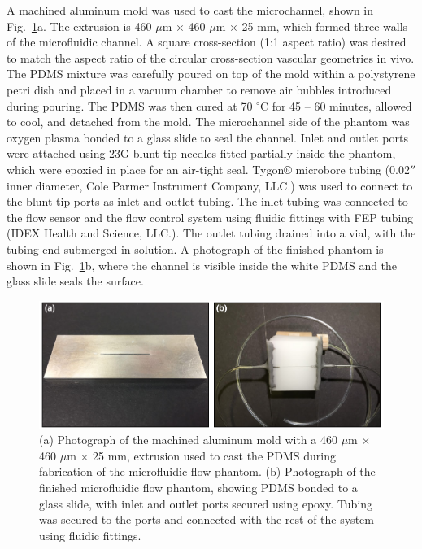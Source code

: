 \documentclass[12pt]{spieman}
\begin{document}
\begin{spacing}{2}
A machined aluminum mold was used to cast the microchannel, shown in Fig.~\ref{fig:microfluidic}a. The extrusion is 460 $\mu$m $\times$ 460 $\mu$m $\times$ 25 mm, which formed three walls of the microfluidic channel. A square cross-section (1:1 aspect ratio) was desired to match the aspect ratio of the circular cross-section vascular geometries in vivo. The PDMS  mixture was carefully poured on top of the mold within a polystyrene petri dish and placed in a vacuum chamber to remove air bubbles introduced during pouring. The PDMS was then cured at 70 $^\circ$C for 45 -- 60 minutes, allowed to cool, and detached from the mold. The microchannel side of the phantom was oxygen plasma bonded to a glass slide to seal the channel. Inlet and outlet ports were attached using 23G blunt tip needles fitted partially inside the phantom, which were epoxied in place for an air-tight seal. Tygon® microbore tubing (0.02$''$ inner diameter, Cole Parmer Instrument Company, LLC.) was used to connect to the blunt tip ports as inlet and outlet tubing. The inlet tubing was connected to the flow sensor and the flow control system using fluidic fittings with FEP tubing (IDEX Health and Science, LLC.). The outlet tubing drained into a vial, with the tubing end submerged in solution. A photograph of the finished phantom is shown in Fig.~\ref{fig:microfluidic}b, where the channel is visible inside the white PDMS and the glass slide seals the surface.

\begin{figure}
    \includegraphics[width=\textwidth]{Figure1.pdf}
    \caption {
        (a) Photograph of the machined aluminum mold with a 460 $\mu$m $\times$ 460 $\mu$m $\times$ 25 mm, extrusion used to cast the PDMS during fabrication of the microfluidic flow phantom. (b) Photograph of the finished microfluidic flow phantom, showing PDMS bonded to a glass slide, with inlet and outlet ports secured using epoxy. Tubing was secured to the ports and connected with the rest of the system using fluidic fittings.
    }
    \label{fig:microfluidic}
\end{figure}


\end{spacing}
\end{document}

